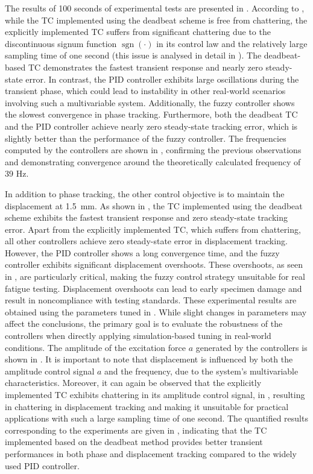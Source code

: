 \documentclass[lettersize,journal]{IEEEtran}
\DeclareMathOperator{\sgn}{sgn}
\begin{document}
The results of 100 seconds of experimental tests are presented in . According to , while the TC implemented using the deadbeat scheme is free from chattering, the explicitly implemented TC suffers from significant chattering due to the discontinuous signum function $\sgn(\cdot)$ in its control law and the relatively large sampling time of one second (this issue is analysed in detail in ). The deadbeat-based TC demonstrates the fastest transient response and nearly zero steady-state error. In contrast, the PID controller exhibits large oscillations during the transient phase, which could lead to instability in other real-world scenarios involving such a multivariable system. Additionally, the fuzzy controller shows the slowest convergence in phase tracking. Furthermore, both the deadbeat TC and the PID controller achieve nearly zero steady-state tracking error, which is slightly better than the performance of the fuzzy controller. The frequencies computed by the controllers are shown in , confirming the previous observations and demonstrating convergence around the theoretically calculated frequency of 39 Hz.

In addition to phase tracking, the other control objective is to maintain the displacement at 1.5~mm. As shown in , the TC implemented using the deadbeat scheme exhibits the fastest transient response and zero steady-state tracking error. Apart from the explicitly implemented TC, which suffers from chattering, all other controllers achieve zero steady-state error in displacement tracking. However, the PID controller shows a long convergence time, and the fuzzy controller exhibits significant displacement overshoots. These overshoots, as seen in , are particularly critical, making the fuzzy control strategy unsuitable for real fatigue testing. Displacement overshoots can lead to early specimen damage and result in noncompliance with testing standards.
These experimental results are obtained using the parameters tuned in . While slight changes in parameters may affect the conclusions, the primary goal is to evaluate the robustness of the controllers when directly applying simulation-based tuning in real-world conditions. The amplitude of the excitation force $a$ generated by the controllers is shown in . It is important to note that displacement is influenced by both the amplitude control signal $a$ and the frequency, due to the system’s multivariable characteristics. Moreover, it can again be observed that the explicitly implemented TC exhibits chattering in its amplitude control signal, in , resulting in chattering in displacement tracking and making it unsuitable for practical applications with such a large sampling time of one second.
The quantified results corresponding to the experiments are given in , indicating that the TC implemented based on the deadbeat method provides better transient performances in both phase and displacement tracking compared to the widely used PID controller.
\end{document}
